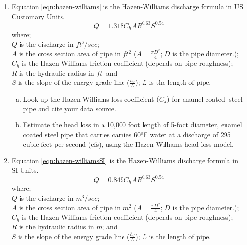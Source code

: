 \documentclass[12pt]{article}
\newcommand\tab[1][1cm]{\hspace*{#1}}
\begin{document}
\begin{enumerate}
\item Equation \ref{eqn:hazen-williams} is the  Hazen-Williams discharge formula in US Customary Units. 
\begin{equation}
Q = 1.318 C_h A R^{0.63} S^{0.54}
\label{eqn:hazen-williams}
\end{equation}
where;\\
\tab $Q$ is the discharge in $ft^3/sec$;\\
\tab $A$ is the cross section area of pipe in $ft^2$ ($A = \frac{\pi D^2}{4}$; $D$ is the pipe diameter.);\\
\tab $C_h$ is the Hazen-Williams friction coefficient (depends on pipe roughness);\\
\tab $R$ is the hydraulic radius in $ft$; and \\
\tab $S$ is the slope of the energy grade line ($\frac{h_f}{L}$); $L$ is the length of pipe.
\begin{enumerate}[(a)]
\item Look up the Hazen-Williams loss coefficient ($C_h$) for enamel coated, steel pipe and cite your data source.
\item Estimate the head loss in a 10,000 foot length of 5-foot diameter, enamel coated steel pipe that carries carries 60$^o$F water at a discharge of 295 cubic-feet per second (cfs), using the Hazen-Williams head loss model.
\end{enumerate}
\clearpage
\item Equation \ref{eqn:hazen-williamsSI} is the  Hazen-Williams discharge formula in SI Units. 
\begin{equation}
Q = 0.849 C_h A R^{0.63} S^{0.54}
\label{eqn:hazen-williamsSI}
\end{equation}
where;\\
\tab $Q$ is the discharge in $m^3/sec$;\\
\tab $A$ is the cross section area of pipe in $m^2$ ($A = \frac{\pi D^2}{4}$; $D$ is the pipe diameter.);\\
\tab $C_h$ is the Hazen-Williams friction coefficient (depends on pipe roughness);\\
\tab $R$ is the hydraulic radius in $m$; and \\
\tab $S$ is the slope of the energy grade line ($\frac{h_f}{L}$); $L$ is the length of pipe.
\begin{enumerate}[(a)]

\end{enumerate}
\end{enumerate}
\end{document}
